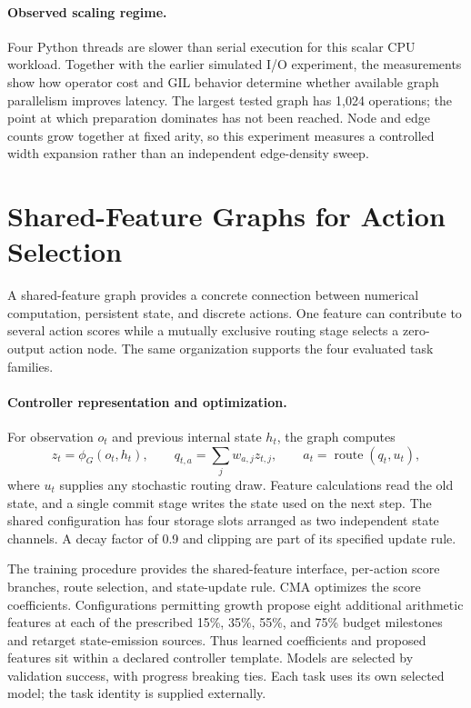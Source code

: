 \paragraph{Observed scaling regime.}
Four Python threads are slower than serial execution for this scalar CPU
workload. Together with the earlier simulated I/O experiment, the measurements
show how operator cost and GIL behavior determine whether available graph
parallelism improves latency. The largest tested graph has 1,024 operations;
the point at which preparation dominates has not been reached. Node and edge
counts grow together at fixed arity, so this experiment measures a controlled
width expansion rather than an independent edge-density sweep.

\section{Shared-Feature Graphs for Action Selection}
\label{app:revision_action}

A shared-feature graph provides a concrete connection between numerical
computation, persistent state, and discrete actions. One feature can contribute
to several action scores while a mutually exclusive routing stage selects a
zero-output action node. The same organization supports the four evaluated
task families.

\paragraph{Controller representation and optimization.}
For observation $o_t$ and previous internal state $h_t$, the graph computes
\begin{equation}
 z_t=\phi_G(o_t,h_t),\qquad
 q_{t,a}=\sum_j w_{a,j}z_{t,j},\qquad
 a_t=\operatorname{route}(q_t,u_t),
\label{eq:revision_action_model}
\end{equation}
where $u_t$ supplies any stochastic routing draw. Feature calculations read the
old state, and a single commit stage writes the state used on the next step.
The shared configuration has four storage slots arranged as two independent
state channels. A decay factor of 0.9 and clipping are part of its specified
update rule.

The training procedure provides the shared-feature interface, per-action score
branches, route selection, and state-update rule. CMA optimizes the score
coefficients. Configurations permitting growth propose eight additional
arithmetic features at each of the prescribed 15\%, 35\%, 55\%, and 75\%
budget milestones and retarget state-emission sources. Thus learned coefficients
and proposed features sit within a declared controller template. Models are
selected by validation success, with progress breaking ties. Each task uses
its own selected model; the task identity is supplied externally.

